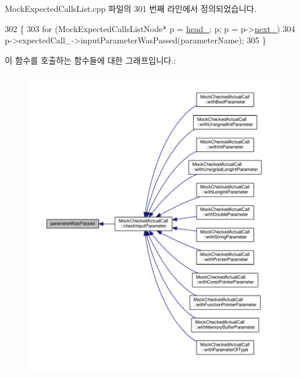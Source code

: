 Mock\+Expected\+Calls\+List.\+cpp 파일의 301 번째 라인에서 정의되었습니다.


\begin{DoxyCode}
302 \{
303     \textcolor{keywordflow}{for} (MockExpectedCallsListNode* p = \hyperlink{class_mock_expected_calls_list_a18290c3c0a206882dd8e0d9f446e2fe6}{head\_}; p; p = p->\hyperlink{class_mock_expected_calls_list_1_1_mock_expected_calls_list_node_aaae452a372ae14c06a6d5d252df73725}{next\_})
304         p->expectedCall\_->inputParameterWasPassed(parameterName);
305 \}
\end{DoxyCode}


이 함수를 호출하는 함수들에 대한 그래프입니다.\+:
\nopagebreak
\begin{figure}[H]
\begin{center}
\leavevmode
\includegraphics[width=350pt]{class_mock_expected_calls_list_a236efae763fa47a7df636a5e148b6c31_icgraph}
\end{center}
\end{figure}


